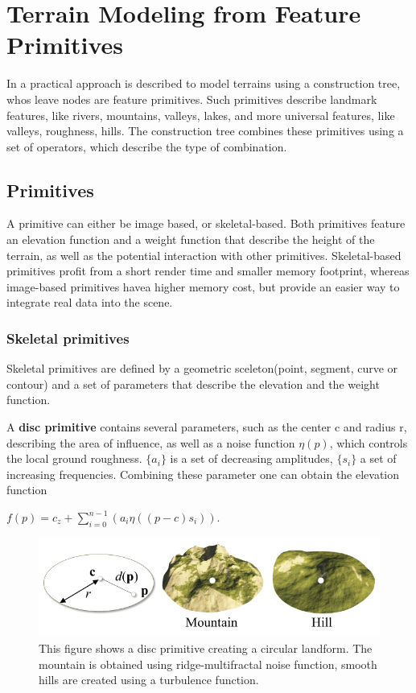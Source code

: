 \section{Terrain Modeling from Feature Primitives}
In \cite{CGF:CGF12530} a practical approach is described to model terrains using a construction tree, whos leave nodes are feature primitives. Such primitives describe landmark features, like rivers, mountains, valleys, lakes, and more universal features, like valleys, roughness, hills. The construction tree combines these primitives using a set of operators, which describe the type of combination. 

\subsection{Primitives}
A primitive can either be image based, or skeletal-based. Both primitives feature an elevation function and a weight function that describe the height of the terrain, as well as the potential interaction with other primitives. Skeletal-based primitives profit from a short render time and smaller memory footprint, whereas image-based primitives havea higher memory cost, but provide an easier way to integrate real data into the scene. 

\subsubsection{Skeletal primitives}
Skeletal primitives are defined by a geometric sceleton(point, segment, curve or contour) and a set of parameters that describe the elevation and the weight function. 

A \textbf{disc primitive} contains several parameters, such as the center c and radius r, describing the area of influence, as well as a noise function $\eta(p) $, which controls the local ground roughness. $\{a_i\}$ is a set of decreasing amplitudes, $\{s_i\}$ a set of increasing frequencies. Combining these parameter one can obtain the elevation function
\begin{center}
$ f(p) = c_{z} +  \sum\limits_{i = 0}^{n-1}(a_i\eta((p-c)s_i))$. 
\end{center}

\begin{figure}[htb]
	\centering
	\includegraphics[width=.8\linewidth]{CGFCGF12530/disc_primitive}
	\caption{This figure shows a disc primitive creating a circular landform. The mountain is obtained using ridge-multifractal noise function, smooth hills are created using a turbulence function.}
	\label{fig:disc_primitive}
\end{figure}

